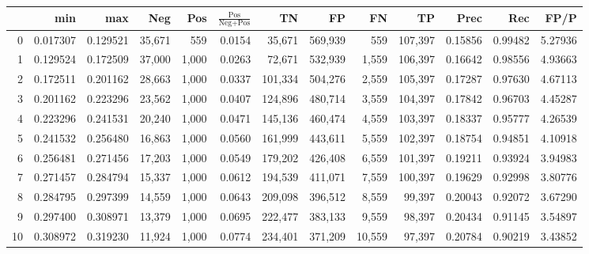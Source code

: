 \begin{tabular}{rrrrrrrrrrrrr}
\toprule
{} &       min &       max &     Neg &    Pos & $\frac{\text{Pos}}{\text{Neg}+\text{Pos}}$ &       TN &       FP &       FN &       TP &     Prec &      Rec &     FP/P \\
\midrule
0   &  0.017307 &  0.129521 &  35,671 &    559 &                                     0.0154 &   35,671 &  569,939 &      559 &  107,397 &  0.15856 &  0.99482 &  5.27936 \\
1   &  0.129524 &  0.172509 &  37,000 &  1,000 &                                     0.0263 &   72,671 &  532,939 &    1,559 &  106,397 &  0.16642 &  0.98556 &  4.93663 \\
2   &  0.172511 &  0.201162 &  28,663 &  1,000 &                                     0.0337 &  101,334 &  504,276 &    2,559 &  105,397 &  0.17287 &  0.97630 &  4.67113 \\
3   &  0.201162 &  0.223296 &  23,562 &  1,000 &                                     0.0407 &  124,896 &  480,714 &    3,559 &  104,397 &  0.17842 &  0.96703 &  4.45287 \\
4   &  0.223296 &  0.241531 &  20,240 &  1,000 &                                     0.0471 &  145,136 &  460,474 &    4,559 &  103,397 &  0.18337 &  0.95777 &  4.26539 \\
5   &  0.241532 &  0.256480 &  16,863 &  1,000 &                                     0.0560 &  161,999 &  443,611 &    5,559 &  102,397 &  0.18754 &  0.94851 &  4.10918 \\
6   &  0.256481 &  0.271456 &  17,203 &  1,000 &                                     0.0549 &  179,202 &  426,408 &    6,559 &  101,397 &  0.19211 &  0.93924 &  3.94983 \\
7   &  0.271457 &  0.284794 &  15,337 &  1,000 &                                     0.0612 &  194,539 &  411,071 &    7,559 &  100,397 &  0.19629 &  0.92998 &  3.80776 \\
8   &  0.284795 &  0.297399 &  14,559 &  1,000 &                                     0.0643 &  209,098 &  396,512 &    8,559 &   99,397 &  0.20043 &  0.92072 &  3.67290 \\
9   &  0.297400 &  0.308971 &  13,379 &  1,000 &                                     0.0695 &  222,477 &  383,133 &    9,559 &   98,397 &  0.20434 &  0.91145 &  3.54897 \\
10  &  0.308972 &  0.319230 &  11,924 &  1,000 &                                     0.0774 &  234,401 &  371,209 &   10,559 &   97,397 &  0.20784 &  0.90219 &  3.43852 \\

\end{tabular}
